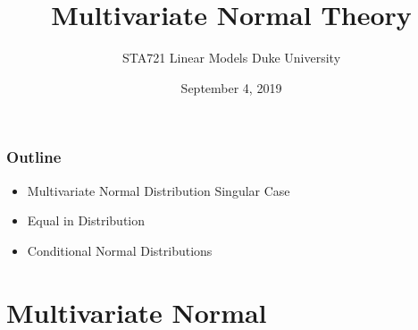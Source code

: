 \documentclass[handout]{beamer}
\title{Multivariate Normal Theory}
\institute{Merlise Clyde}
\author{STA721 Linear Models Duke University}
\date{September 4, 2019}
\begin{document}
\maketitle

\begin{frame} \frametitle{Outline}

  \begin{itemize}

  \item Multivariate Normal Distribution Singular Case
  \item Equal in Distribution
  \item Conditional Normal Distributions

  \end{itemize}
\end{frame}


\section{Multivariate Normal}
\end{document}
